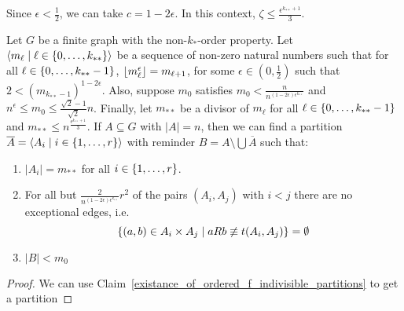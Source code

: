 
    \begin{remark}\label{subpair_bound_specification}
        Since $\epsilon < \frac{1}{2}$, we can take $c = 1 - 2\epsilon$.
        In this context, $\zeta \leq \frac{\epsilon^{k_{**}+1}}{3}$.
    \end{remark}

    \begin{lemma}[Claim 4.14] \label{existance_of_equitative_partition_with_bound_exceptional_pairs}
        Let $G$ be a finite graph with the non-$k_{*}$-order property.
        Let $\left< m_\ell \mid \ell \in \left\{ 0, \dots, k_{**} \right\} \right>$ be a sequence of non-zero natural numbers such that
        for all $\ell \in \left\{ 0, \dots, k_{**}-1 \right\}$, $\left\lfloor m_\ell^\epsilon \right\rfloor = m_{\ell+1}$,
        for some $\epsilon \in (0, \frac{1}{2})$ such that $2 < (m_{k_{**}-1})^{1-2\epsilon}$.
        Also, suppose $m_0$ satisfies $m_0 < \frac{n}{n^{(1 - 2\epsilon)\epsilon^{k_{**}}}}$ and
        $n^\epsilon \leq m_0 \leq \frac{\sqrt{2}-1}{\sqrt{2}} n$.
        Finally, let $m_{**}$ be a divisor of $m_\ell$ for all $\ell \in \left\{ 0, \dots, k_{**}-1 \right\}$ and
        $m_{**} \leq n^{\frac{\epsilon^{k_{**}+1}}{3}}$.
        If $A \subseteq G$ with $|A| = n$, then we can find a partition $\overline{A} = \left< A_i \mid i \in \left\{ 1, \dots, r \right\} \right>$
        with reminder $B = A \setminus \bigcup \overline{A}$ such that:
        \begin{enumerate}
            \item\label{itm:4.14.1} $|A_i| = m_{**}$ for all $i \in \left\{ 1, \dots, r \right\}$.
            \item\label{itm:4.14.2} For all but $\frac{2}{n^{(1-2\epsilon)\epsilon^{k_{**}}}}r^2$ of the pairs
                $(A_i, A_j)$ with $i<j$ there are no exceptional edges, i.e.
                \[
                    \left\{ (a,b) \in A_i \times A_j \mid a R b \not\equiv t(A_i, A_j) \right\} = \emptyset
                \]
            \item\label{itm:4.14.3} $|B| < m_0$
        \end{enumerate}
        \begin{proof}
            We can use Claim~\ref{existance_of_ordered_f_indivisible_partitions} to get a partition

\end{proof}
\end{lemma}

